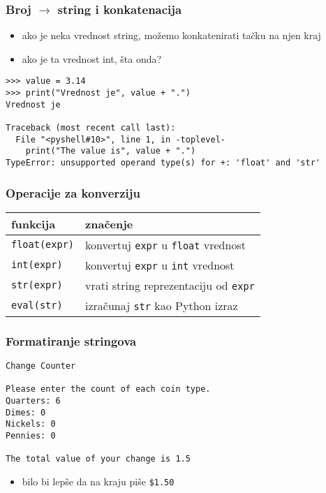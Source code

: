 \documentclass[utf8,compress,aspectratio=169]{beamer}
\begin{document}
\begin{frame}[fragile,shrink=6]
  \frametitle{Broj $\rightarrow$ string i konkatenacija}
  \begin{itemize}
    \item ako je neka vrednost string, možemo konkatenirati tačku na njen kraj
    \item ako je ta vrednost int, šta onda?
  \end{itemize}
\begin{verbatim}
>>> value = 3.14
>>> print("Vrednost je", value + ".")
Vrednost je

Traceback (most recent call last):
  File "<pyshell#10>", line 1, in -toplevel-
    print("The value is", value + ".")
TypeError: unsupported operand type(s) for +: 'float' and 'str'
\end{verbatim}
\end{frame}

\begin{frame}[fragile]
  \frametitle{Operacije za konverziju}
\begin{center}
\begin{tabular}{l|l}
\textbf{funkcija} & \textbf{značenje} \\ \hline
\texttt{float(expr)} & konvertuj \texttt{expr} u \texttt{float} vrednost \\
\texttt{int(expr)} & konvertuj \texttt{expr} u \texttt{int} vrednost \\
\texttt{str(expr)} & vrati string reprezentaciju od \texttt{expr} \\
\texttt{eval(str)} & izračunaj \texttt{str} kao Python izraz
\end{tabular}
\end{center}
\end{frame}

\begin{frame}[fragile]
  \frametitle{Formatiranje stringova}
\begin{verbatim}
Change Counter

Please enter the count of each coin type.
Quarters: 6
Dimes: 0
Nickels: 0
Pennies: 0

The total value of your change is 1.5
\end{verbatim}
  \begin{itemize}
    \item bilo bi lepše da na kraju piše \texttt{\$1.50}
  \end{itemize}
\end{frame}
\end{document}
